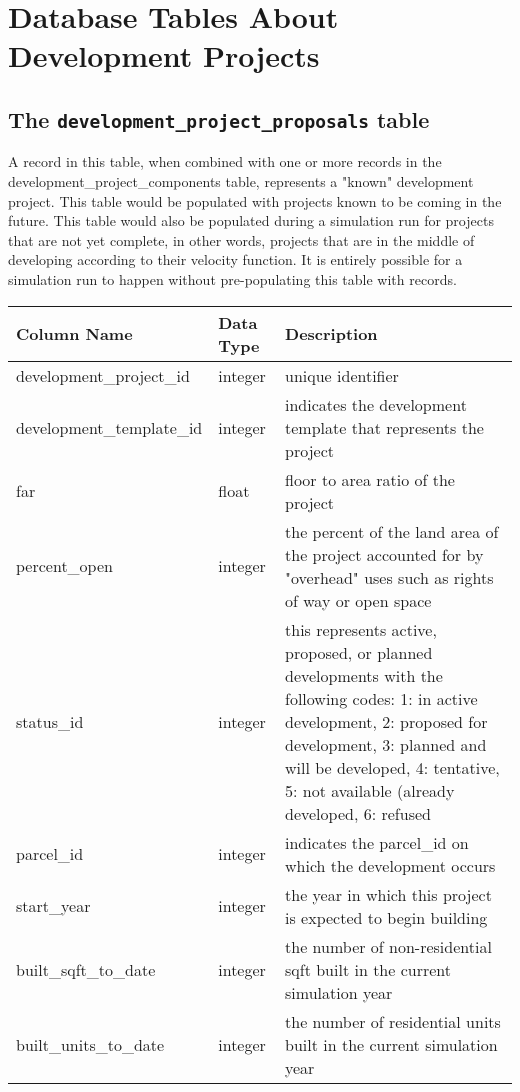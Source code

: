 \section{Database Tables About Development Projects}

\subsection{The {\tt development\_project\_proposals} table}
\label{sec:db-tables-development-project-proposals}

A record in this table, when combined with one or more records in the development\_project\_components table, represents a "known" development project. This table would be populated with projects known to be coming in the future. This table would also be populated during a simulation run for projects that are not yet complete, in other words, projects that are in the middle of developing according to their velocity function. It is entirely possible for a simulation run to happen without pre-populating this table with records.

\begin{tabular}{p{2in}lp{3.5in}}
\textbf{Column Name} & \textbf{Data Type} & \textbf{Description} \\
\hline
development\_project\_id & integer & unique identifier \\ \hline
development\_template\_id & integer & indicates the development template that represents the project\\ \hline
far & float & floor to area ratio of the project\\ \hline
percent\_open & integer & the percent of the land area of the project accounted for by "overhead" uses such as rights of way or open space\\ \hline
status\_id & integer & this represents active, proposed, or planned developments with the following codes: 
1: in active development, 2: proposed for development, 3: planned and will be developed, 4: tentative, 
5: not available (already developed, 6: refused\\ \hline
parcel\_id & integer & indicates the parcel\_id on which the development occurs\\ \hline
start\_year & integer &  the year in which this project is expected to begin building\\ \hline
built\_sqft\_to\_date & integer & the number of non-residential sqft built in the current simulation year\\ \hline
built\_units\_to\_date & integer & the number of residential units built in the current simulation year \\ \hline
\end{tabular}


